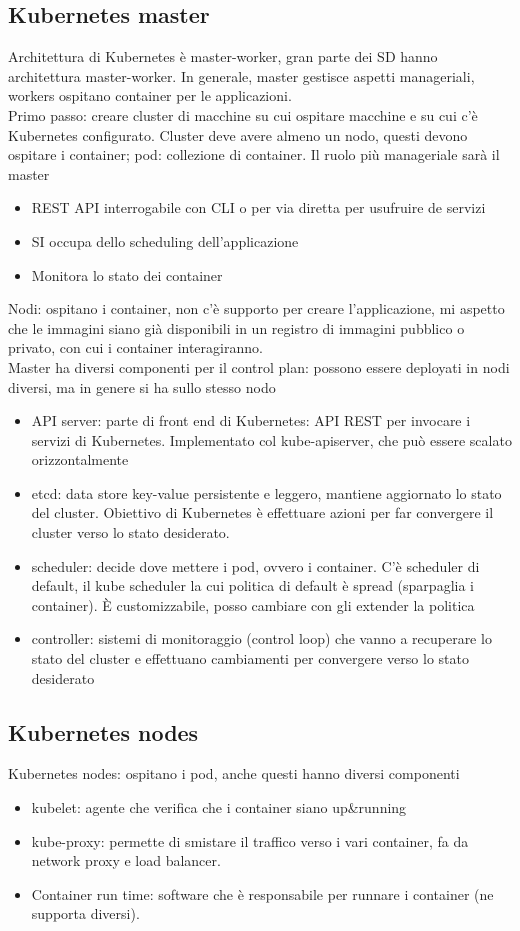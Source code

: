 \documentclass{article}
\begin{document}
\subsection{Kubernetes master}
Architettura di Kubernetes è master-worker, gran parte dei SD hanno architettura master-worker. In generale, master gestisce aspetti manageriali, workers ospitano container per le applicazioni.\\ Primo passo: creare cluster di macchine su cui ospitare macchine e su cui c'è Kubernetes configurato. Cluster deve avere almeno un nodo, questi devono ospitare i container; pod: collezione di container. Il ruolo più manageriale sarà il master
\begin{itemize}
\item REST API interrogabile con CLI o per via diretta per usufruire de servizi
\item SI occupa dello scheduling dell'applicazione
\item Monitora lo stato dei container
\end{itemize}
Nodi: ospitano i container, non c'è supporto per creare l'applicazione, mi aspetto che le immagini siano già disponibili in un registro di immagini pubblico o privato, con cui i container interagiranno.\\ Master ha diversi componenti per il control plan: possono essere deployati in nodi diversi, ma in genere si ha sullo stesso nodo
\begin{itemize}
\item API server: parte di front end di Kubernetes: API REST per invocare i servizi di Kubernetes. Implementato col kube-apiserver, che può essere scalato orizzontalmente
\item etcd: data store key-value persistente e leggero, mantiene aggiornato lo stato del cluster. Obiettivo di Kubernetes è effettuare azioni per far convergere il cluster verso lo stato desiderato.
\item scheduler: decide dove mettere i pod, ovvero i container. C'è scheduler di default, il kube scheduler la cui politica di default è spread (sparpaglia i container). È customizzabile, posso cambiare con gli extender la politica
\item controller: sistemi di monitoraggio (control loop) che vanno a recuperare lo stato del cluster e effettuano cambiamenti per convergere verso lo stato desiderato
\end{itemize}
\subsection{Kubernetes nodes}
Kubernetes nodes: ospitano i pod, anche questi hanno diversi componenti
\begin{itemize}
\item kubelet: agente che verifica che i container siano up\&running
\item kube-proxy: permette di smistare il traffico verso i vari container, fa da network proxy e load balancer.
\item Container run time: software che è responsabile per runnare i container (ne supporta diversi).
\end{itemize}
\end{document}
